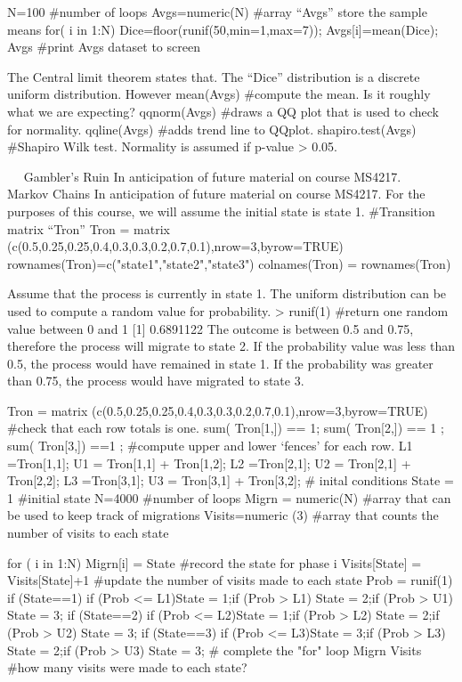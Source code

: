 N=100				#number of loops
Avgs=numeric(N)		#array “Avgs” store the sample means
for( i in 1:N)
	{	Dice=floor(runif(50,min=1,max=7));	Avgs[i]=mean(Dice);
	}
Avgs				#print Avgs dataset to screen

The Central limit theorem states that.
The “Dice” distribution is a discrete uniform distribution. However 
mean(Avgs)			#compute the mean. Is it roughly what we are expecting?
qqnorm(Avgs)			#draws a QQ plot that is used to check for normality.
qqline(Avgs)			#adds trend line to QQplot.
shapiro.test(Avgs)		#Shapiro Wilk test. Normality is assumed if p-value > 0.05.
			
 
Gambler’s Ruin
In anticipation of future material on course MS4217.
 
Markov Chains
In anticipation of future material on course MS4217.
For the purposes of this course, we will assume the initial state is state 1.
#Transition matrix “Tron”
Tron = matrix (c(0.5,0.25,0.25,0.4,0.3,0.3,0.2,0.7,0.1),nrow=3,byrow=TRUE)
rownames(Tron)=c("state1","state2","state3")
colnames(Tron) = rownames(Tron)

Assume that the process is currently in state 1. The uniform distribution can be used to compute a random value for probability.
> runif(1)			#return one random value between 0 and 1
[1] 0.6891122
The outcome is between 0.5 and 0.75, therefore the process will migrate to state 2. If the probability value was less than 0.5, the process would have remained in state 1. If the probability was greater than 0.75, the  process would have migrated to state 3.

Tron = matrix (c(0.5,0.25,0.25,0.4,0.3,0.3,0.2,0.7,0.1),nrow=3,byrow=TRUE)
#check that each row totals is one.
sum( Tron[1,]) == 1;  	sum( Tron[2,]) == 1 ; 	sum( Tron[3,]) ==1 ;
#compute upper and lower ‘fences’ for each row.
L1 =Tron[1,1];      	 U1 = Tron[1,1] + Tron[1,2];
L2 =Tron[2,1];      	 U2 = Tron[2,1] + Tron[2,2];
L3 =Tron[3,1]; 		U3 = Tron[3,1] + Tron[3,2];
# inital conditions
State = 1		#initial state
N=4000			#number of loops
Migrn = numeric(N)	#array that can be used to keep track of migrations
Visits=numeric (3)	#array that counts the number of visits to each state
 

for ( i in 1:N)
{
Migrn[i] = State			#record the state for phase i
Visits[State] = Visits[State]+1		#update the number of visits made to each state
Prob = runif(1)
if (State==1){ 
  	        if (Prob <= L1){State = 1};if (Prob > L1) {State = 2};if (Prob > U1) {State = 3};
	        }
 if (State==2){ 
  	        if (Prob <= L2){State = 1};if (Prob > L2) {State = 2};if (Prob > U2) {State = 3};
	     	       }
if (State==3){ 
  	        if (Prob <= L3){State = 3};if (Prob > L3) {State = 2};if (Prob > U3) {State = 3};
	     	       }
}	# complete the "for" loop
Migrn			
Visits			#how many visits were made to each state?

